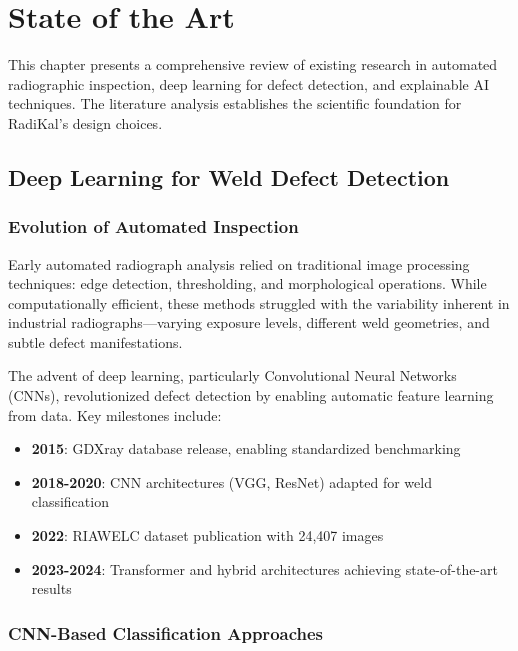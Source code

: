 \documentclass[12pt,a4paper]{report}
\begin{document}
\chapter{State of the Art}

This chapter presents a comprehensive review of existing research in automated radiographic inspection, deep learning for defect detection, and explainable AI techniques. The literature analysis establishes the scientific foundation for RadiKal's design choices.

\section{Deep Learning for Weld Defect Detection}

\subsection{Evolution of Automated Inspection}

Early automated radiograph analysis relied on traditional image processing techniques: edge detection, thresholding, and morphological operations. While computationally efficient, these methods struggled with the variability inherent in industrial radiographs---varying exposure levels, different weld geometries, and subtle defect manifestations.

The advent of deep learning, particularly Convolutional Neural Networks (CNNs), revolutionized defect detection by enabling automatic feature learning from data. Key milestones include:

\begin{itemize}
    \item \textbf{2015}: GDXray database release, enabling standardized benchmarking
    \item \textbf{2018-2020}: CNN architectures (VGG, ResNet) adapted for weld classification
    \item \textbf{2022}: RIAWELC dataset publication with 24,407 images
    \item \textbf{2023-2024}: Transformer and hybrid architectures achieving state-of-the-art results
\end{itemize}

\subsection{CNN-Based Classification Approaches}
\end{document}
